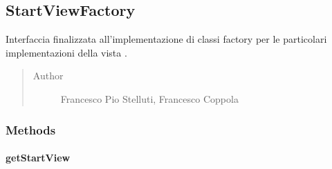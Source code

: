 \documentclass[letterpaper,10pt,italian,openany,oneside]{sphinxmanual}
\begin{document}
\begin{fulllineitems}
\label{\detokenize{source/it/unicam/cs/pa/mastermind/factories/RandomBotMakerFactory:it.unicam.cs.pa.mastermind.factories.RandomBotMakerFactory.getName()}}
\end{fulllineitems}



\subsection{StartViewFactory}
\label{\detokenize{source/it/unicam/cs/pa/mastermind/factories/StartViewFactory:startviewfactory}}\label{\detokenize{source/it/unicam/cs/pa/mastermind/factories/StartViewFactory::doc}}

\begin{fulllineitems}
\label{\detokenize{source/it/unicam/cs/pa/mastermind/factories/StartViewFactory:it.unicam.cs.pa.mastermind.factories.StartViewFactory}}
Interfaccia finalizzata all’implementazione di classi factory per le particolari implementazioni della vista .
\begin{quote}\begin{description}
\item[{Author}] \leavevmode
Francesco Pio Stelluti, Francesco Coppola

\end{description}\end{quote}

\end{fulllineitems}



\subsubsection{Methods}
\label{\detokenize{source/it/unicam/cs/pa/mastermind/factories/StartViewFactory:methods}}

\paragraph{getStartView}
\label{\detokenize{source/it/unicam/cs/pa/mastermind/factories/StartViewFactory:getstartview}}
\end{document}
